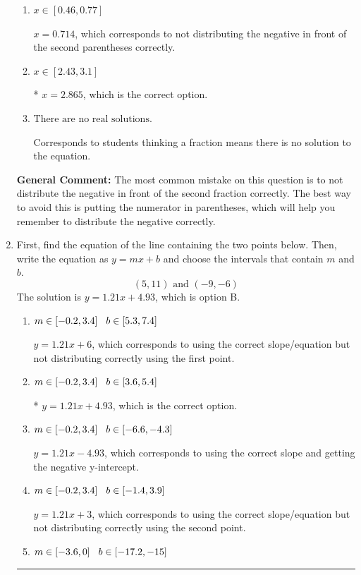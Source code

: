 \documentclass{extbook}[14pt]
\newcommand{\litem}[1]{\item #1

\rule{\textwidth}{0.4pt}}
\begin{document}
\begin{enumerate}
{\begin{enumerate}[label=\Alph*.]
$x = 31.667$, which corresponds to getting the negative of the actual solution.
\item \( x \in [0.46, 0.77] \)

$x = 0.714$, which corresponds to not distributing the negative in front of the second parentheses correctly.
\item \( x \in [2.43, 3.1] \)

* $x = 2.865$, which is the correct option.
\item \( \text{There are no real solutions.} \)

Corresponds to students thinking a fraction means there is no solution to the equation.
\end{enumerate}

\textbf{General Comment:} The most common mistake on this question is to not distribute the negative in front of the second fraction correctly. The best way to avoid this is putting the numerator in parentheses, which will help you remember to distribute the negative correctly.
}
\litem{
First, find the equation of the line containing the two points below. Then, write the equation as $ y=mx+b $ and choose the intervals that contain $m$ and $b$.
\[ (5, 11) \text{ and } (-9, -6) \]
The solution is \( y = 1.21x + 4.93 \), which is option B.\begin{enumerate}[label=\Alph*.]
\item \( m \in [-0.2, 3.4] \hspace*{3mm} b \in [5.3, 7.4] \)

 $y = 1.21x + 6$, which corresponds to using the correct slope/equation but not distributing correctly using the first point.
\item \( m \in [-0.2, 3.4] \hspace*{3mm} b \in [3.6, 5.4] \)

* $y = 1.21x + 4.93$, which is the correct option.
\item \( m \in [-0.2, 3.4] \hspace*{3mm} b \in [-6.6, -4.3] \)

 $y = 1.21x -4.93$, which corresponds to using the correct slope and getting the negative y-intercept.
\item \( m \in [-0.2, 3.4] \hspace*{3mm} b \in [-1.4, 3.9] \)

 $y = 1.21x + 3$, which corresponds to using the correct slope/equation but not distributing correctly using the second point.
\item \( m \in [-3.6, 0] \hspace*{3mm} b \in [-17.2, -15] \)


\end{enumerate}}
\end{enumerate}
\end{document}
